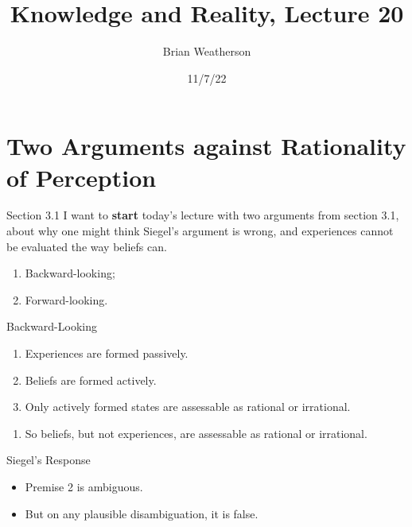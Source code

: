 \documentclass[
  17pt,
  letterpaper,
  ignorenonframetext,
  aspectratio=169,
  xcolor={dvipsnames}]{beamer}
\title{Knowledge and Reality, Lecture 20}
\author{Brian Weatherson}
\date{11/7/22}
\providecommand{\tightlist}{%
  \setlength{\itemsep}{0pt}\setlength{\parskip}{0pt}}\usepackage{longtable,booktabs,array}
\begin{document}
\frame{\titlepage}
\ifdefined\Shaded\renewenvironment{Shaded}{\begin{tcolorbox}[frame hidden, enhanced, breakable, boxrule=0pt, sharp corners, interior hidden, borderline west={3pt}{0pt}{shadecolor}]}{\end{tcolorbox}}\fi

\hypertarget{two-arguments-against-rationality-of-perception}{%
\section{Two Arguments against Rationality of
Perception}\label{two-arguments-against-rationality-of-perception}}

\begin{frame}{Section 3.1}
\protect\hypertarget{section-3.1}{}
I want to \textbf{start} today's lecture with two arguments from section
3.1, about why one might think Siegel's argument is wrong, and
experiences cannot be evaluated the way beliefs can.

\begin{enumerate}[<+->]
\tightlist
\item
  Backward-looking;
\item
  Forward-looking.
\end{enumerate}
\end{frame}

\begin{frame}{Backward-Looking}
\protect\hypertarget{backward-looking}{}
\begin{enumerate}[<+->]
\tightlist
\item
  Experiences are formed passively.
\item
  Beliefs are formed actively.
\item
  Only actively formed states are assessable as rational or irrational.
\end{enumerate}

\begin{enumerate}[<+->]
[A.]
\setcounter{enumi}{2}
\tightlist
\item
  So beliefs, but not experiences, are assessable as rational or
  irrational.
\end{enumerate}
\end{frame}

\begin{frame}{Siegel's Response}
\protect\hypertarget{siegels-response}{}
\begin{itemize}[<+->]
\tightlist
\item
  Premise 2 is ambiguous.
\item
  But on any plausible disambiguation, it is false.
\end{itemize}
\end{frame}
\end{document}
